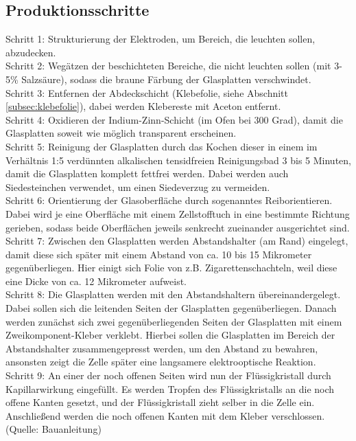 \subsection{Produktionsschritte}
Schritt 1: Strukturierung der Elektroden, um Bereich, die leuchten sollen, abzudecken.\\
Schritt 2: Wegätzen der beschichteten Bereiche, die nicht leuchten sollen (mit 3-5\% Salzsäure), sodass die braune Färbung der Glasplatten verschwindet.\\
Schritt 3: Entfernen der Abdeckschicht (Klebefolie, siehe Abschnitt \ref{subsec:klebefolie}), dabei werden Klebereste mit Aceton entfernt.\\
Schritt 4: Oxidieren der Indium-Zinn-Schicht (im Ofen bei 300 Grad), damit die Glasplatten soweit wie möglich transparent erscheinen.\\
Schritt 5: Reinigung der Glasplatten durch das Kochen dieser in einem im Verhältnis 1:5 verdünnten alkalischen tensidfreien Reinigungsbad 3 bis 5 Minuten, damit die Glasplatten komplett fettfrei werden. Dabei werden auch Siedesteinchen verwendet, um einen Siedeverzug zu vermeiden.\\
Schritt 6: Orientierung der Glasoberfläche durch sogenanntes {\quote Reiborientieren}. Dabei wird je eine Oberfläche mit einem Zellstofftuch in eine bestimmte Richtung gerieben, sodass beide Oberflächen jeweils senkrecht zueinander ausgerichtet sind. \\
Schritt 7: Zwischen den Glasplatten werden Abstandshalter (am Rand) eingelegt, damit diese sich später mit einem Abstand von ca. 10 bis 15 Mikrometer  gegenüberliegen. Hier einigt sich Folie von z.B. Zigarettenschachteln, weil diese eine Dicke von ca. 12 Mikrometer aufweist.\\
Schritt 8: Die Glasplatten werden mit den Abstandshaltern übereinandergelegt. Dabei sollen sich die leitenden Seiten der Glasplatten gegenüberliegen. Danach werden zunächst sich zwei gegenüberliegenden Seiten der Glasplatten mit einem Zweikomponent-Kleber verklebt. Hierbei sollen die Glasplatten im Bereich der Abstandshalter zusammengepresst werden, um den Abstand zu bewahren, ansonsten zeigt die Zelle später eine langsamere elektrooptische Reaktion. \\
Schritt 9: An einer der noch offenen Seiten wird nun der Flüssigkristall durch Kapillarwirkung eingefüllt. Es werden Tropfen des  Flüssigkristalls an die noch offene Kanten gesetzt, und der Flüssigkristall zieht selber in die Zelle ein. Anschließend werden die noch offenen Kanten mit dem Kleber verschlossen.	
(Quelle: Bauanleitung)

